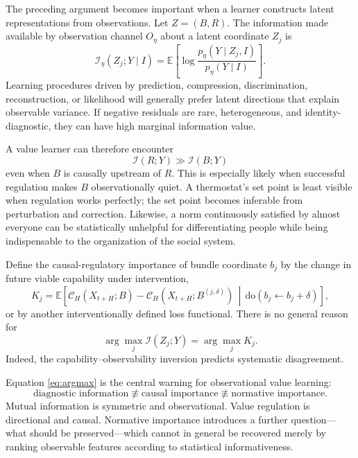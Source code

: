 \documentclass[11pt]{article}
\newcommand{\E}{\mathbb{E}}
\newcommand{\I}{\mathcal{I}}
\newcommand{\C}{\mathcal{C}}
\newcommand{\doop}{\mathrm{do}}
\begin{document}
The preceding argument becomes important when a learner constructs latent representations from observations. Let $Z=(B,R)$. The information made available by observation channel $O_\eta$ about a latent coordinate $Z_j$ is
\begin{equation}
    \I_\eta(Z_j;Y\mid I)
    =
    \E\left[
    \log
    \frac{p_\eta(Y\mid Z_j,I)}
         {p_\eta(Y\mid I)}
    \right].
    \label{eq:obsinfo}
\end{equation}
Learning procedures driven by prediction, compression, discrimination, reconstruction, or likelihood will generally prefer latent directions that explain observable variance. If negative residuals are rare, heterogeneous, and identity-diagnostic, they can have high marginal information value.

A value learner can therefore encounter
\begin{equation}
    \I(R;Y)
    \gg
    \I(B;Y)
\end{equation}
even when $B$ is causally upstream of $R$. This is especially likely when successful regulation makes $B$ observationally quiet. A thermostat's set point is least visible when regulation works perfectly; the set point becomes inferable from perturbation and correction. Likewise, a norm continuously satisfied by almost everyone can be statistically unhelpful for differentiating people while being indispensable to the organization of the social system.

Define the causal-regulatory importance of bundle coordinate $b_j$ by the change in future viable capability under intervention,
\begin{equation}
    K_j
    =
    \E\left[
      \C_H(X_{t+H};B)
      -
      \C_H(X_{t+H};B^{(j,\delta)})
      \,\middle|\,
      \doop(b_j\leftarrow b_j+\delta)
    \right],
    \label{eq:causalimportance}
\end{equation}
or by another interventionally defined loss functional. There is no general reason for
\begin{equation}
    \arg\max_j \I(Z_j;Y)
    =
    \arg\max_j K_j.
    \label{eq:argmax}
\end{equation}
Indeed, the capability--observability inversion predicts systematic disagreement.

Equation \eqref{eq:argmax} is the central warning for observational value learning:
\begin{equation}
\boxed{
    \text{diagnostic information}
    \not\equiv
    \text{causal importance}
    \not\equiv
    \text{normative importance}.
}
\end{equation}
Mutual information is symmetric and observational. Value regulation is directional and causal. Normative importance introduces a further question---what should be preserved---which cannot in general be recovered merely by ranking observable features according to statistical informativeness.
\end{document}

